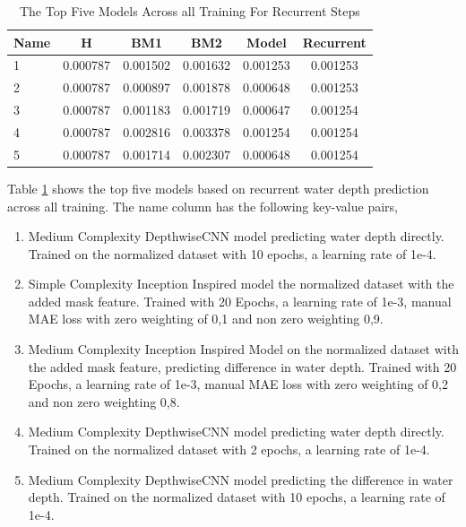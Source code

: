 \begin{table}[htbp]
	\centering
	\caption{The Top Five Models Across all Training For Recurrent Steps}
	\label{tab:best_r}
	\begin{tabular}{p{2cm}ccccc}
		\toprule
		Name &  H &  BM1 &  BM2 &  Model &  Recurrent \\
		\midrule
		1 &       0.000787 &        0.001502 &        0.001632 &   0.001253 &            0.001253 \\
		2 &       0.000787 &        0.000897 &        0.001878 &   0.000648 &            0.001253 \\
		3 &       0.000787 &        0.001183 &        0.001719 &   0.000647 &            0.001254 \\
		4 &       0.000787 &        0.002816 &        0.003378 &   0.001254 &            0.001254 \\
		5 &       0.000787 &        0.001714 &        0.002307 &   0.000648 &            0.001254 \\
		\bottomrule
	\end{tabular}
\end{table}
Table \ref{tab:best_r} shows the top five models based on recurrent water depth prediction across all training. The name column has the following key-value pairs,
\begin{enumerate}
	\item Medium Complexity DepthwiseCNN model predicting water depth directly. Trained on the normalized dataset with 10 epochs, a learning rate of 1e-4. 
	\item Simple Complexity Inception Inspired model the normalized dataset with the added mask feature. Trained with 20 Epochs, a learning rate of 1e-3, manual MAE loss with zero weighting of 0,1 and non zero weighting 0,9.
	\item Medium Complexity Inception Inspired Model on the normalized dataset with the  added mask feature, predicting difference in water depth. Trained with 20 Epochs, a learning rate of 1e-3, manual MAE loss with zero weighting of 0,2 and non zero weighting 0,8.
	\item Medium Complexity DepthwiseCNN model predicting water depth directly. Trained on the normalized dataset with 2 epochs, a learning rate of 1e-4.
	\item Medium Complexity DepthwiseCNN model predicting the difference in  water depth. Trained on the normalized dataset with 10 epochs, a learning rate of 1e-4.
\end{enumerate}

